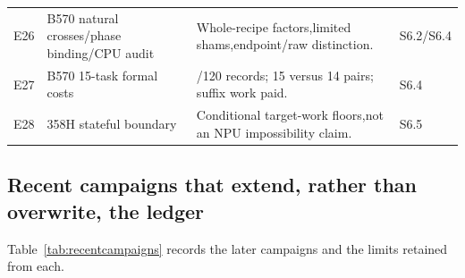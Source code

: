\begin{table}[tp]
\begin{tabular}{@{}>{\raggedright\arraybackslash}p{}>{\raggedright\arraybackslash}p{}>{\raggedright\arraybackslash}p{}>{\raggedright\arraybackslash}p{}@{}}
E26 & B570 natural crosses/phase binding/CPU audit & Whole-recipe factors,limited shams,endpoint/raw distinction. & S6.2/S6.4\\
E27 & B570 15-task formal costs & 119/120 records; 15 versus 14 pairs; suffix work paid. & S6.4\\
E28 & 358H stateful boundary & Conditional target-work floors,not an NPU impossibility claim. & S6.5\\
\bottomrule\end{tabular}
\end{table}
\subsection{Recent campaigns that extend, rather than overwrite, the ledger}
Table~\ref{tab:recentcampaigns} records the later campaigns and the limits retained from each.
